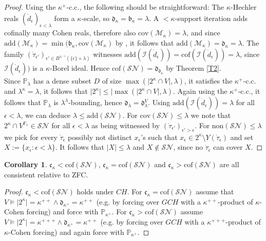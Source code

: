\documentclass[12pt,a4paper]{scrartcl}
\theoremstyle{definition}
\newtheorem{corollary}[definition] {Corollary}
\numberwithin{equation}{section}
\begin{document}
\begin{proof}
Using the $\kappa^+$-c.c., the following should be straightforward: The $\kappa$-Hechler reals $(\dot{d}_\epsilon)_{\epsilon < \lambda}$ form a $\kappa$-scale, so $\mathfrak{d}_\kappa=\mathfrak{b}_\kappa=\lambda$. A ${<}\kappa$-support iteration adds cofinally many Cohen reals, therefore also $\text{cov}(\mathcal{M}_\kappa)=\lambda$, and since $\text{add}(\mathcal{M}_\kappa)= \min( \mathfrak{b}_\kappa, \text{cov}(\mathcal{M}_\kappa)$ by \citep{Baumhauer}, it follows that $\text{add}(\mathcal{M}_\kappa)=\mathfrak{d}_\kappa= \lambda$. The family $(\dot{\tau}_{\epsilon'})_{ \epsilon' \in B^{\lambda \, ^{-1}} (\{\epsilon\} \times \lambda)}$ witnesses $\text{add}(\mathcal{I}(\dot{d}_\epsilon))=\text{cof}(\mathcal{I}(\dot{d}_\epsilon)) =\lambda$, since $\mathcal{I}(\dot{d}_\epsilon))$ is a $\kappa$-Borel ideal. Hence $\text{cof}(\mathcal{SN})=\mathfrak{d}_{\mathfrak{d}_\kappa}$ by Theorem \ref{T2}.\\
Since $\mathbb{P}_\lambda$ has a dense subset $D$ of size $\max(\vert 2^\kappa \cap V \vert, \lambda)$, it satisfies the $\kappa^+$-c.c. and $\lambda^\kappa=\lambda$, it follows that $\vert 2^\kappa\vert \leq \vert\max(\vert 2^\kappa \cap V \vert, \lambda)$. Again using the $\kappa^+$-c.c., it follows that $\mathbb{P}_\lambda$ is $\lambda^\lambda$-bounding, hence $\mathfrak{d}_\lambda=\mathfrak{d}_\lambda^V$. Using $\text{add}(\mathcal{I}(\dot{d}_\epsilon))=\lambda$ for all $\epsilon< \lambda$, we can deduce $\lambda \leq \text{add}(\mathcal{SN})$. For $\text{cov}(\mathcal{SN}) \leq \lambda$ we note that $2^\kappa \cap V^{\mathbb{P}_\epsilon} \in \mathcal{SN}$ for all $\epsilon<\lambda$ as being witnessed by $(\dot{\tau}_{\epsilon'})_{\epsilon'> \epsilon}$. For $\text{non}(\mathcal{SN}) \leq \lambda$ we pick for every $\dot{\tau}_\epsilon$ possibly not distinct $x_\epsilon$'s such that $x_\epsilon \in 2^\kappa \setminus Y(\dot{\tau}_\epsilon)$ and set $X:=\{x_\epsilon \colon \epsilon< \lambda\}$. It follows that $\vert X \vert \leq \lambda$ and $X \notin \mathcal{SN}$, since no $\dot{\tau}_\epsilon$ can cover $X$.
\end{proof}

\begin{corollary}
$\mathfrak{c}_\kappa < \text{cof}(\mathcal{SN})$, $\mathfrak{c}_\kappa = \text{cof}(\mathcal{SN})$ and $\mathfrak{c}_\kappa > \text{cof}(\mathcal{SN})$ are all consistent relative to ZFC.
\end{corollary}

\begin{proof}
$\mathfrak{c}_\kappa < \text{cof}(\mathcal{SN})$ holds under $CH$. For $\mathfrak{c}_\kappa = \text{cof}(\mathcal{SN})$ assume that $V \vDash \vert 2^\kappa \vert = \kappa^{++} \land \mathfrak{d}_{\kappa^+}=\kappa^{++}$ (e.g. by forcing over $GCH$ with a $\kappa^{++}$-product of $\kappa$-Cohen forcing) and force with $\mathbb{P}_{\kappa^+}$. For $\mathfrak{c}_\kappa > \text{cof}(\mathcal{SN})$ assume $V \vDash \vert 2^\kappa \vert = \kappa^{+++} \land \mathfrak{d}_{\kappa^+}=\kappa^{++}$ (e.g. by forcing over $GCH$ with a $\kappa^{+++}$-product of $\kappa$-Cohen forcing) and again force with  $\mathbb{P}_{\kappa^+}$.
\end{proof}
\end{document}

